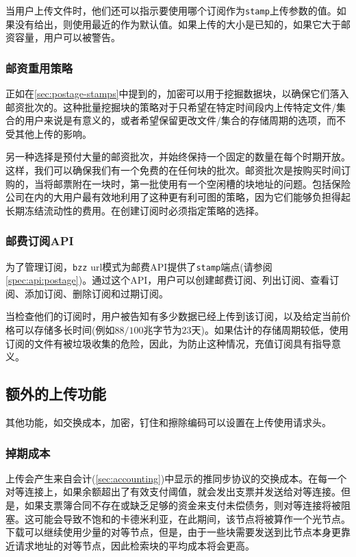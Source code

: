 当用户上传文件时，他们还可以指示要使用哪个订阅作为\lstinline{stamp}上传参数的值。如果没有给出，则使用最近的作为默认值。如果上传的大小是已知的，如果它大于邮资容量，用户可以被警告。 

\subsubsection{邮资重用策略}

正如在\ref{sec:postage-stamps}中提到的，加密可以用于挖掘数据块，以确保它们落入邮资批次的。这种批量挖掘块的策略对于只希望在特定时间段内上传特定文件/集合的用户来说是有意义的，或者希望保留更改文件/集合的存储周期的选项，而不受其他上传的影响。

另一种选择是预付大量的邮资批次，并始终保持一个固定的数量在每个时期开放。这样，我们可以确保我们有一个免费的在任何块的批次。邮资批次是按购买时间订购的，当将邮票附在一块时，第一批使用有一个空闲槽的块地址的问题。包括保险公司在内的大用户最有效地利用了这种更有利可图的策略，因为它们能够负担得起长期冻结流动性的费用。在创建订阅时必须指定策略的选择。

\subsubsection{邮费订阅API}

为了管理订阅，\lstinline{bzz} url模式为邮费API提供了\lstinline{stamp}端点(请参阅\ref{spec:api:postage})。通过这个API，用户可以创建邮费订阅、列出订阅、查看订阅、添加订阅、删除订阅和过期订阅。

当检查他们的订阅时，用户被告知有多少数据已经上传到该订阅，以及给定当前价格可以存储多长时间(例如$88/100$兆字节为$23$天)。如果估计的存储周期较低，使用订阅的文件有被垃圾收集的危险，因此，为防止这种情况，充值订阅具有指导意义。


\subsection{额外的上传功能\statusgreen}\label{sec:features}

其他功能，如交换成本，加密，钉住和擦除编码可以设置在上传使用请求头。 


\subsubsection{掉期成本}

上传会产生来自会计(\ref{sec:accounting})中显示的推同步协议的交换成本。在每一个对等连接上，如果余额超出了有效支付阈值，就会发出支票并发送给对等连接。但是，如果支票簿合同不存在或缺乏足够的资金来支付未偿债务，则对等连接将被阻塞。这可能会导致不饱和的卡德米利亚，在此期间，该节点将被算作一个光节点。下载可以继续使用少量的对等节点，但是，由于一些块需要发送到比节点本身更靠近请求地址的对等节点，因此检索块的平均成本将会更高。

